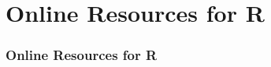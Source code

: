 \section[Online Resources]{Online Resources for R}
\begin{frame}
  \frametitle{Online Resources for R}


\end{frame}
